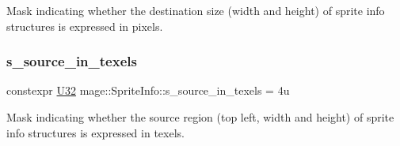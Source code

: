 Mask indicating whether the destination size (width and height) of sprite info structures is expressed in pixels. \hypertarget{structmage_1_1_sprite_info_a2a67b4908c2851013e754124bc304fa9}{}\label{structmage_1_1_sprite_info_a2a67b4908c2851013e754124bc304fa9} 
\subsubsection{\texorpdfstring{s\+\_\+source\+\_\+in\+\_\+texels}{s\_source\_in\_texels}}
{\footnotesize\ttfamily constexpr \hyperlink{namespacemage_a41c104c036fba3756a74e19f793eeaa1}{U32} mage\+::\+Sprite\+Info\+::s\+\_\+source\+\_\+in\+\_\+texels = 4u\hspace{0.3cm}{\ttfamily [static]}}

Mask indicating whether the source region (top left, width and height) of sprite info structures is expressed in texels. 